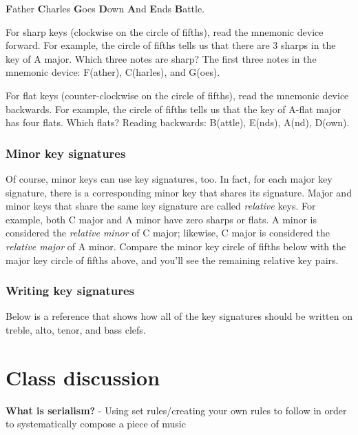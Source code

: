 \documentclass{book}
\begin{document}
\textbf{F}ather \textbf{C}harles \textbf{G}oes \textbf{D}own \textbf{A}nd
\textbf{E}nds \textbf{B}attle.

For sharp keys (clockwise on the circle of fifths), read the mnemonic device
forward. For example, the circle of fifths tells us that there are 3 sharps in
the key of A major. Which three notes are sharp? The first three notes in the
mnemonic device: F(ather), C(harles), and G(oes).

For flat keys (counter-clockwise on the circle of fifths), read the mnemonic
device backwards. For example, the circle of fifths tells us that the key of
A-flat major has four flats. Which flats? Reading backwards: B(attle), E(nds),
A(nd), D(own).

\hypertarget{minor-key-signatures}{%
\subsection{Minor key signatures}\label{minor-key-signatures}}

Of course, minor keys can use key signatures, too. In fact, for each major key
signature, there is a corresponding minor key that shares its signature. Major
and minor keys that share the same key signature are called \emph{relative}
keys. For example, both C major and A minor have zero sharps or flats. A minor
is considered the \emph{relative minor} of C major; likewise, C major is
considered the \emph{relative major} of A minor. Compare the minor key circle
of fifths below with the major key circle of fifths above, and you'll see the
remaining relative key pairs.

\hypertarget{writing-key-signatures}{%
\subsection{Writing key signatures}\label{writing-key-signatures}}

Below is a reference that shows how all of the key signatures should be
written on treble, alto, tenor, and bass clefs.

\hypertarget{class-discussion-59}{%
\chapter{Class discussion}\label{class-discussion-59}}

\textbf{What is serialism?} - Using set rules/creating your own rules to
follow in order to systematically compose a piece of music
\end{document}
